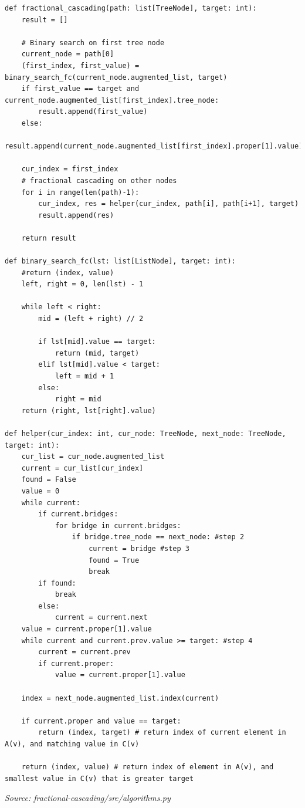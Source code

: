 \documentclass[12pt,english,]{article}
\begin{document}
\begin{lstlisting}
def fractional_cascading(path: list[TreeNode], target: int):
    result = []

    # Binary search on first tree node
    current_node = path[0]
    (first_index, first_value) = binary_search_fc(current_node.augmented_list, target)
    if first_value == target and current_node.augmented_list[first_index].tree_node:
        result.append(first_value)
    else:
        result.append(current_node.augmented_list[first_index].proper[1].value)

    cur_index = first_index
    # fractional cascading on other nodes
    for i in range(len(path)-1):
        cur_index, res = helper(cur_index, path[i], path[i+1], target)
        result.append(res)

    return result

def binary_search_fc(lst: list[ListNode], target: int):
    #return (index, value)
    left, right = 0, len(lst) - 1

    while left < right:
        mid = (left + right) // 2

        if lst[mid].value == target:
            return (mid, target)
        elif lst[mid].value < target:
            left = mid + 1
        else:
            right = mid 
    return (right, lst[right].value)

def helper(cur_index: int, cur_node: TreeNode, next_node: TreeNode, target: int):
    cur_list = cur_node.augmented_list
    current = cur_list[cur_index]
    found = False
    value = 0
    while current:
        if current.bridges:
            for bridge in current.bridges:
                if bridge.tree_node == next_node: #step 2
                    current = bridge #step 3
                    found = True
                    break
        if found:
            break
        else:
            current = current.next
    value = current.proper[1].value
    while current and current.prev.value >= target: #step 4
        current = current.prev
        if current.proper:
            value = current.proper[1].value
    
    index = next_node.augmented_list.index(current)

    if current.proper and value == target:
        return (index, target) # return index of current element in A(v), and matching value in C(v)

    return (index, value) # return index of element in A(v), and smallest value in C(v) that is greater target
\end{lstlisting}
\vspace{-9truemm}
\begin{minipage}{1\textwidth}
  \begin{flushright}
  {\footnotesize \emph{Source: fractional-cascading/src/algorithms.py }\par}
  \end{flushright}
\end{minipage}
\vspace{0.5truemm}
\end{document}
